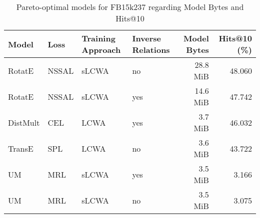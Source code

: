 \begin{table}[H]
\centering
\caption{Pareto-optimal models for FB15k237 regarding Model Bytes and Hits@10}
\label{tab:skyline_fb15k237_model_bytes}
\begin{tabular}{llllrr}
\toprule
    Model &   Loss & Training Approach & Inverse Relations & Model Bytes &  Hits@10 (\%) \\
\midrule
   RotatE &  NSSAL &             sLCWA &                no &    28.8 MiB &       48.060 \\
   RotatE &  NSSAL &             sLCWA &               yes &    14.6 MiB &       47.742 \\
 DistMult &    CEL &              LCWA &               yes &     3.7 MiB &       46.032 \\
   TransE &    SPL &              LCWA &                no &     3.6 MiB &       43.722 \\
       UM &    MRL &             sLCWA &               yes &     3.5 MiB &        3.166 \\
       UM &    MRL &             sLCWA &                no &     3.5 MiB &        3.075 \\
\bottomrule
\end{tabular}
\end{table}

